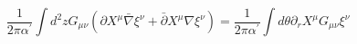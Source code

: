 \begin{equation}
\frac{1}{2\pi\alpha^\prime}\int d^2 z G_{\mu\nu}(\partial
X^\mu\bar\nabla\xi^\nu+ \bar\partial
X^\mu\nabla\xi^\nu)=\frac{1}{2\pi\alpha^\prime}\int
d\theta\partial_r X^\mu G_{\mu\nu}\xi^\nu
\end{equation}

